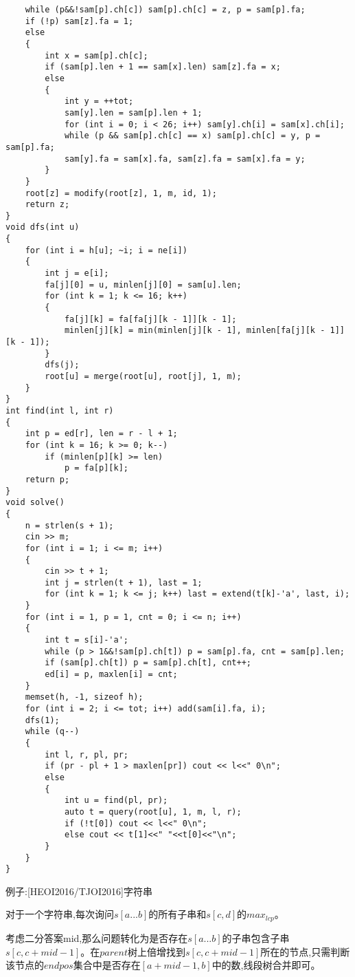 \documentclass[a4paper,fontset=none]{ctexart}
\begin{document}
\begin{verbatim}
    while (p&&!sam[p].ch[c]) sam[p].ch[c] = z, p = sam[p].fa;
    if (!p) sam[z].fa = 1;
    else
    {
        int x = sam[p].ch[c];
        if (sam[p].len + 1 == sam[x].len) sam[z].fa = x;
        else
        {
            int y = ++tot;
            sam[y].len = sam[p].len + 1;
            for (int i = 0; i < 26; i++) sam[y].ch[i] = sam[x].ch[i];
            while (p && sam[p].ch[c] == x) sam[p].ch[c] = y, p = sam[p].fa;
            sam[y].fa = sam[x].fa, sam[z].fa = sam[x].fa = y;
        }
    }
    root[z] = modify(root[z], 1, m, id, 1);
    return z;
}
void dfs(int u)
{
    for (int i = h[u]; ~i; i = ne[i])
    {
        int j = e[i];
        fa[j][0] = u, minlen[j][0] = sam[u].len;
        for (int k = 1; k <= 16; k++)
        {
            fa[j][k] = fa[fa[j][k - 1]][k - 1];
            minlen[j][k] = min(minlen[j][k - 1], minlen[fa[j][k - 1]][k - 1]);
        }
        dfs(j);
        root[u] = merge(root[u], root[j], 1, m);
    }
}
int find(int l, int r)
{
    int p = ed[r], len = r - l + 1;
    for (int k = 16; k >= 0; k--)
        if (minlen[p][k] >= len)
            p = fa[p][k];
    return p;
}
void solve()
{
    n = strlen(s + 1);
    cin >> m;
    for (int i = 1; i <= m; i++)
    {
        cin >> t + 1;
        int j = strlen(t + 1), last = 1;
        for (int k = 1; k <= j; k++) last = extend(t[k]-'a', last, i);
    }
    for (int i = 1, p = 1, cnt = 0; i <= n; i++)
    {
        int t = s[i]-'a';
        while (p > 1&&!sam[p].ch[t]) p = sam[p].fa, cnt = sam[p].len;
        if (sam[p].ch[t]) p = sam[p].ch[t], cnt++;
        ed[i] = p, maxlen[i] = cnt;
    }
    memset(h, -1, sizeof h);
    for (int i = 2; i <= tot; i++) add(sam[i].fa, i);
    dfs(1);
    while (q--)
    {
        int l, r, pl, pr;
        if (pr - pl + 1 > maxlen[pr]) cout << l<<" 0\n";
        else
        {
            int u = find(pl, pr);
            auto t = query(root[u], 1, m, l, r);
            if (!t[0]) cout << l<<" 0\n";
            else cout << t[1]<<" "<<t[0]<<"\n";
        }
    }
}
\end{verbatim}

例子:[HEOI2016/TJOI2016]字符串

对于一个字符串,每次询问$s[a...b]$的所有子串和$s[c,d]$的$max_{lcp}$。

考虑二分答案mid,那么问题转化为是否存在$s[a...b]$的子串包含子串$s[c,c+mid-1]$。在$parent$树上倍增找到$s[c,c+mid-1]$所在的节点,只需判断该节点的$endpos$集合中是否存在$[a+mid-1,b]$中的数,线段树合并即可。
\end{document}

